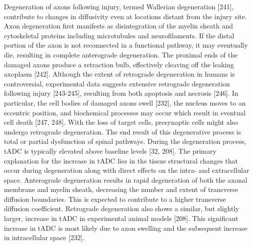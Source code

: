 Degeneration of axons following injury, termed Wallerian degeneration [241], contribute to changes in diffusivity even at locations distant from the injury site.  Axon degeneration first manifests as disintegration of the myelin sheath and cytoskeletal proteins including microtubules and neurofilaments.  If the distal portion of the axon is not reconnected in a functional pathway, it may eventually die, resulting in complete anterograde degeneration.  The proximal ends of the damaged axons produce a retraction bulb, effectively cleaving off the leaking axoplasm [242].  Although the extent of retrograde degeneration in humans is controversial, experimental data suggests extensive retrograde degeneration following injury [243-245], resulting from both apoptosis and necrosis [246].  In particular, the cell bodies of damaged axons swell [232], the nucleus moves to an eccentric position, and biochemical processes may occur which result in eventual cell death [247, 248].  With the loss of target cells, presynaptic cells might also undergo retrograde degeneration.  The end result of this degenerative process is total or partial dysfunction of spinal pathways. 
During the degeneration process, tADC is typically elevated above baseline levels [32, 208].  The primary explanation for the increase in tADC lies in the tissue structural changes that occur during degeneration along with direct effects on the intra- and extracellular space.  Anterograde degeneration results in rapid degeneration of both the axonal membrane and myelin sheath, decreasing the number and extent of transverse diffusion boundaries.  This is expected to contribute to a higher transverse diffusion coefficient.  Retrograde degeneration also shows a similar, but slightly larger, increase in tADC in experimental animal models [208].  This significant increase in tADC is most likely due to axon swelling and the subsequent increase in intracellular space [232]. 
